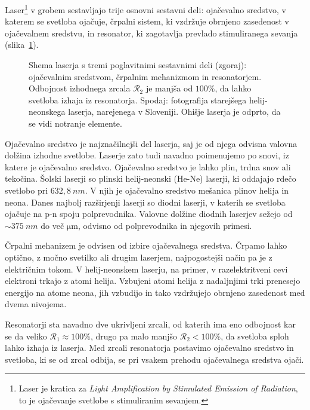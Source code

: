 Laser\footnote{Laser je kratica za {\it Light Amplification by Stimulated
Emission of Radiation}, to je ojačevanje svetlobe s stimuliranim sevanjem.} 
v grobem sestavljajo trije osnovni sestavni deli: ojačevalno sredstvo,
v katerem se svetloba ojačuje, črpalni sistem, ki vzdržuje obrnjeno zasedenost
v ojačevalnem sredstvu, in resonator, ki zagotavlja prevlado stimuliranega sevanja
(slika~\ref{fig:11_laser}).

\begin{figure}[ht!]
\centering
\def\svgwidth{100truemm} 

\caption{Shema laserja s tremi poglavitnimi sestavnimi deli (zgoraj): 
ojačevalnim sredstvom, črpalnim mehanizmom in resonatorjem. Odbojnost 
izhodnega zrcala $\mathcal{R}_2$ je manjša od $100\%$, da lahko svetloba 
izhaja iz resonatorja. Spodaj: fotografija starejšega helij-neonskega laserja,
narejenega v Sloveniji. Ohišje laserja je odprto, da se vidi notranje elemente.
}
\label{fig:11_laser}
\end{figure}

Ojačevalno sredstvo je najznačilnejši del laserja, saj je od njega odvisna 
valovna dolžina izhodne svetlobe. Laserje zato tudi navadno poimenujemo
po snovi, iz katere je ojačevalno sredstvo.
Ojačevalno sredstvo je lahko plin, trdna snov ali tekočina.  
Šolski laserji so plinski helij-neonski (He-Ne) laserji, ki oddajajo 
rdečo svetlobo pri $632,8~\si{nm}$. V njih je ojačevalno sredstvo
mešanica plinov helija in neona. Danes najbolj razširjenji laserji so
diodni laserji, v katerih se svetloba ojačuje na p-n spoju polprevodnika. 
Valovne dolžine diodnih laserjev sežejo od $\sim 375~\si{nm}$ do več 
$\si{\micro\meter}$, odvisno od polprevodnika in njegovih primesi.

Črpalni mehanizem je odvisen od izbire ojačevalnega sredstva. Črpamo lahko 
optično, z močno svetilko ali drugim laserjem, najpogostejši način pa je z
električnim tokom. V helij-neonskem laserju, na primer, v razelektritveni 
cevi elektroni trkajo z atomi helija. Vzbujeni atomi helija z nadaljnjimi
trki prenesejo energijo na atome neona, jih vzbudijo in tako vzdržujejo 
obrnjeno zasedenost med dvema nivojema.

Resonatorji sta navadno dve ukrivljeni zrcali, od katerih ima eno odbojnost
kar se da veliko $\mathcal{R}_1 \approx 100\%$, drugo pa malo manjšo
$\mathcal{R}_2 < 100\%$, da svetloba sploh lahko izhaja iz laserja. 
Med zrcali resonatorja postavimo ojačevalno sredstvo in svetloba, ki se od 
zrcal odbija, se pri vsakem prehodu ojačevalnega sredstva ojači.

